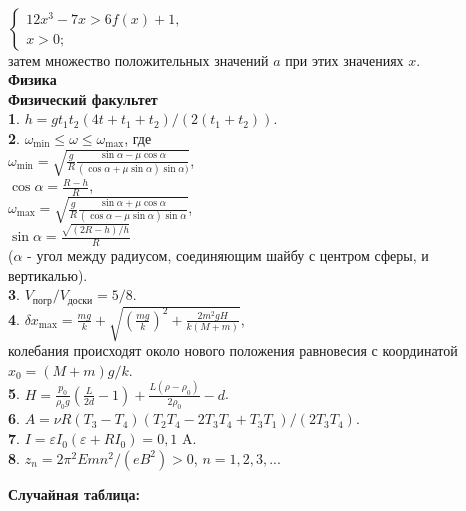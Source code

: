 \begin{multicols*}{2}
\\$\begin{cases}
    12x^3-7x>6f(x)+1,\\
    x>0;
\end{cases}$
\vspace{0.7em}
\\ затем множество положительных значений $a$ при этих значениях $x$.
\vspace{4em}    
\\\textbf{Ф\hspace{0.04cm}и\hspace{0.04cm}з\hspace{0.04cm}и\hspace{0.04cm}к\hspace{0.04cm}а}
\\\textbf{Физический факультет}
\\\textbf{1}. $h=gt_{1}t_{2}(4t+t_{1}+t_{2})/(2(t_{1}+t_{2}))$.
\\\textbf{2}. $\omega_{\text{min}} \leq \omega \leq \omega_{\text{max}}$, где
\\$\omega_{\text{min}} = \sqrt{\frac{g}{R}\frac{\sin{\alpha}-\mu\cos{\alpha}}{(\cos{\alpha}+\mu\sin{\alpha})\sin{\alpha})}}$,\vspace{0.5em}
\\\noindent$\cos{\alpha} = \frac{R-h}{R}$,\vspace{0.5em}
\\$\omega_{\text{max}} = \sqrt{\frac{g}{R}\frac{\sin{\alpha}+\mu\cos{\alpha}}{(\cos{\alpha}-\mu\sin{\alpha})\sin{\alpha}}}$,\vspace{0.5em}
\\$\sin{\alpha}=\frac{\sqrt{(2R-h)/h}}{R}$\vspace{0.5em}
\\\noindent($\alpha$ - угол между радиусом, соединяющим шайбу с центром сферы, и вертикалью).
\\\textbf{3}. $V_{\text{погр}} / V_{\text{доски}} = 5/8$.
\\\textbf{4}. $\delta x_{\text{max}} = \frac{mg}{k}+\sqrt{(\frac{mg}{k})^{2}+\frac{2m^{2}gH}{k(M+m)}}$,\vspace{1em}
\\ колебания происходят около нового положения равновесия с координатой $x_{0}=(M+m)g/k$.
\vspace{1em}
\\\textbf{5}. $H =\frac{p_{0}}{\rho_{0}g}(\frac{L}{2d}-1)+\frac{L(\rho-\rho_{0})}{2\rho_{0}}-d$.
\vspace{0.9em}
\\\textbf{6}. $A =\nu R(T_{3}-T_{4})(T_{2}T_{4}-2T_{3}T_{4}+T_{3}T_{1})/(2T_{3}T_{4})$.
\\\textbf{7}. $I=\varepsilon I_{0}(\varepsilon+RI_{0}) = 0,1$ A.
\\\textbf{8}. $z_{n} = 2 \pi^2 Emn^2/(eB^2) > 0$, $n = 1, 2, 3, ...$



\egroup
\end{multicols*}
\vspace{2em}
\textbf{Случайная таблица:}

